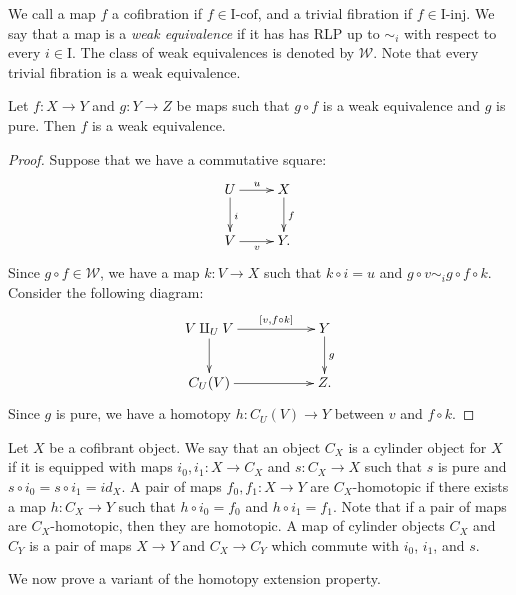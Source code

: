 \documentclass{amsart}
\theoremstyle{definition}
\newcommand{\we}{\mathcal{W}}
\newcommand{\I}{\mathrm{I}}
\newcommand{\class}[2]{#1\text{-}\mathrm{#2}}
\newcommand{\Iinj}[1][\I]{\class{#1}{inj}}
\newcommand{\Icof}[1][\I]{\class{#1}{cof}}
\newcommand{\cyli}{i}
\begin{document}
We call a map $f$ a cofibration if $f \in \Icof$, and a trivial fibration if $f \in \Iinj$.
We say that a map is a \emph{weak equivalence} if it has has RLP up to $\sim_i$ with respect to every $i \in \I$.
The class of weak equivalences is denoted by $\we$.
Note that every trivial fibration is a weak equivalence.

\begin{lem}
Let $f : X \to Y$ and $g : Y \to Z$ be maps such that $g \circ f$ is a weak equivalence and $g$ is pure.
Then $f$ is a weak equivalence.
\end{lem}
\begin{proof}
Suppose that we have a commutative square:
\[ \xymatrix{ U \ar[r]^u \ar[d]^i & X \ar[d]^f \\
              V \ar[r]_v          & Y.
            } \]
Since $g \circ f \in \we$, we have a map $k : V \to X$ such that $k \circ i = u$ and $g \circ v \sim_i g \circ f \circ k$.
Consider the following diagram:
\[ \xymatrix{ V \amalg_U V \ar[rr]^-{[v, f \circ k]} \ar[d] & & Y \ar[d]^g \\
              C_U(V)       \ar[rr]                          & & Z.
            } \]
Since $g$ is pure, we have a homotopy $h : C_U(V) \to Y$ between $v$ and $f \circ k$.
\end{proof}

Let $X$ be a cofibrant object.
We say that an object $C_X$ is a cylinder object for $X$ if it is equipped with maps $\cyli_0,\cyli_1 : X \to C_X$
and $s : C_X \to X$ such that $s$ is pure and $s \circ \cyli_0 = s \circ \cyli_1 = id_X$.
A pair of maps $f_0,f_1 : X \to Y$ are $C_X$-homotopic if there exists a map
$h : C_X \to Y$ such that $h \circ \cyli_0 = f_0$ and $h \circ \cyli_1 = f_1$.
Note that if a pair of maps are $C_X$-homotopic, then they are homotopic.
A map of cylinder objects $C_X$ and $C_Y$ is a pair of maps $X \to Y$
and $C_X \to C_Y$ which commute with $\cyli_0$, $\cyli_1$, and $s$.

We now prove a variant of the homotopy extension property.
\end{document}
